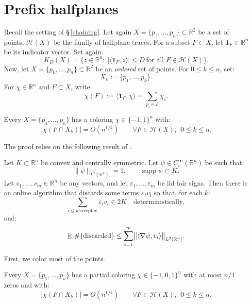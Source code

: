 \documentclass[12pt,reqno]{amsart}
\numberwithin{equation}{section}
\DeclareMathOperator{\E}{\mathbb{E}}
\newcommand{\one}{\mathbf{1}}
\def \R {\mathbb{R}}
\def \e {\varepsilon}
\begin{document}
\section{Prefix halfplanes}\label{sec:prefix}
Recall the setting of \S\,\ref{chaining}. 
Let again \(X=\{p_1,\ldots,p_n\}\subset\R^2\) be a set of points, \(\mathcal H(X)\) be the family of halfplane traces. For a subset \(F\subset X\), let \(\one_F\in\R^n\) be its 
indicator vector. Set again:
\[
K_D(X)=\bigl\{z\in\R^n:\ |\langle\one_F,z\rangle|\le D\ \text{for all }F\in\mathcal H(X)\bigr\}.
\]
Now, let \(X=\{p_1,\ldots,p_n\}\subset\R^2\) be an \emph{ordered} set of points. For \(0\le k\le n\), set:
\[
X_k:=\{p_1,\ldots,p_k\}.
\]
For \(\chi\in\R^n\) and \(F\subset X\), write:
\[
\chi(F):=\langle\one_F,\chi\rangle=\sum_{p_i\in F}\chi_i.
\]
\begin{theorem}\label{thm:prefix}
Every \(X=\{p_1,\ldots,p_n\}\) has a coloring \(\chi\in\{-1,1\}^n\) with:
\[
|\chi(F\cap X_k)|=O(n^{1/4})\qquad\forall F\in\mathcal H(X),\ \ 0\le k\le n.
\]
\end{theorem}
The proof relies on the following result of \cite{Versh-Sm-3}. 
\begin{theorem}\label{thm:SV}
Let \(K\subset\R^n\) be convex and centrally symmetric. Let \(\psi\in C_c^\infty(\R^n)\) be such that:
\[
\|\psi\|_{L^2(\R^n)}=1,\qquad 
\operatorname{supp}\psi\subset K.
\]
Let \(v_1,\ldots,v_m\in\R^n\) be any vectors, and let \(\e_1,\ldots,\e_m\) be iid fair signs. Then there is an online algorithm that discards some terms \(\e_iv_i\) so that, for each \(k\):
\[
\sum_{i\le k\ \mathrm{accepted}}\e_iv_i\in2K
\quad\text{deterministically},
\]
and:
\[
\E\,\#\{\text{\rm discarded}\}\le\sum_{i=1}^m\bigl\|\langle\nabla\psi,v_i\rangle\bigr\|_{L^2(\R^n)}.
\]
\end{theorem}
First, we color most of the points.
\begin{lemma}\label{lem:partial}
Every \(X=\{p_1,\ldots,p_n\}\) has a partial coloring \(\chi\in\{-1,0,1\}^n\) with at most \(n/4\) zeros and with:
\[
|\chi(F\cap X_k)|=O(n^{1/4})\qquad\forall F\in\mathcal H(X),\ \ 0\le k\le n.
\]
\end{lemma}
\end{document}

